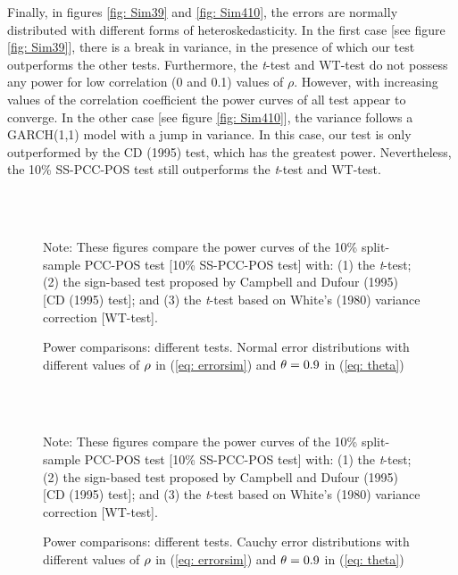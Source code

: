 \documentclass[harvard,11pt]{article}
\begin{document}
Finally, in figures \ref{fig: Sim39} and \ref{fig: Sim410}, the errors are normally distributed with different forms of heteroskedasticity. In the first case [see figure \ref{fig: Sim39}], there is a break in variance, in the presence of which our test outperforms the other tests. Furthermore, the \textit{t}-test and WT-test do not possess any power for low correlation (0 and 0.1) values of $\rho$. However, with increasing values of the correlation coefficient the power curves of all test appear to converge. In the other case [see figure \ref{fig: Sim410}], the variance follows a GARCH(1,1) model with a jump in variance. In this case, our test is only outperformed by the CD (1995) test, which has the greatest power. Nevertheless, the 10\% SS-PCC-POS test still outperforms the \textit{t}-test and WT-test.  
\begin{figure}[tbph]
\caption{Power comparisons: different tests. Normal error distributions with
different values of $\protect\rho $ in (\protect\ref{eq: errorsim}) and $\protect%
\theta =0.9$ in (\protect\ref{eq: theta})}
\begin{center}
 \\[0pt]
\\[0pt]
\end{center}
\doublespacing
Note: These figures compare the power curves of the 10\% split-sample PCC-POS test
[10\% SS-PCC-POS test] with: (1) the \textit{t}-test; (2) the sign-based test
proposed by Campbell and Dufour (1995) [CD (1995) test]; and (3) the \textit{t}-test based
on White's (1980) variance correction [WT-test]. 
\label{fig: Sim17}
\end{figure}


\begin{figure}[tbph]
\caption{Power comparisons: different tests. Cauchy error distributions with
different values of $\protect\rho $ in (\protect\ref{eq: errorsim}) and $\protect%
\theta =0.9$ in (\protect\ref{eq: theta})}
\begin{center}
 \\[0pt]
\\[0pt]
\end{center}
\doublespacing
 Note: These figures compare the power curves of the 10\% split-sample PCC-POS test
[10\% SS-PCC-POS test] with: (1) the \textit{t}-test; (2) the sign-based test
proposed by Campbell and Dufour (1995) [CD (1995) test]; and (3) the \textit{t}-test based
on White's (1980) variance correction [WT-test]. 
\label{fig: Sim28}
\end{figure}
\end{document}
